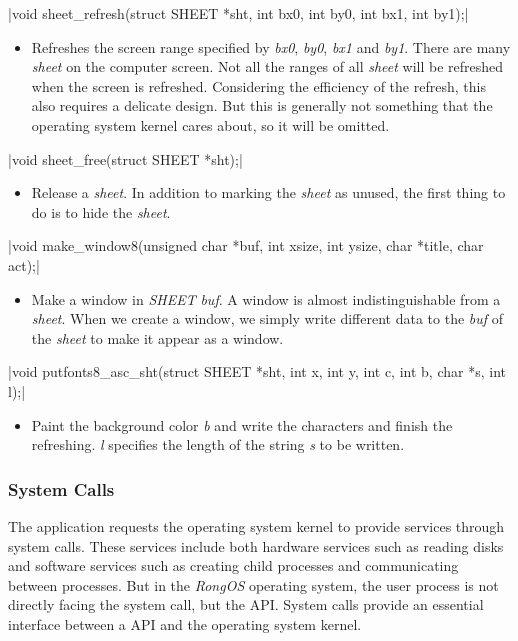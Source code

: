 \documentclass{swfcthesis}
\begin{document}
\csingle|void sheet_refresh(struct SHEET *sht, int bx0, int by0, int bx1, int by1);|
\begin{itemize}
\item Refreshes the screen range specified by \emph{bx0}, \emph{by0}, \emph{bx1} and
  \emph{by1}. There are many \emph{sheet} on the computer screen. Not all the ranges of
  all \emph{sheet} will be refreshed when the screen is refreshed. Considering the
  efficiency of the refresh, this also requires a delicate design. But this is generally
  not something that the operating system kernel cares about, so it will be omitted.
\end{itemize}

\csingle|void sheet_free(struct SHEET *sht);|
\begin{itemize}
\item Release a \emph{sheet}. In addition to marking the \emph{sheet} as unused, the first
  thing to do is to hide the \emph{sheet}. 
\end{itemize}

\csingle|void make_window8(unsigned char *buf, int xsize, int ysize, char *title, char act);|
\begin{itemize}
\item Make a window in \emph{SHEET} \emph{buf}. A window is almost indistinguishable from
  a \emph{sheet}. When we create a window, we simply write different data to the
  \emph{buf} of the \emph{sheet} to make it appear as a window.
  
\end{itemize}

\csingle|void putfonts8_asc_sht(struct SHEET *sht, int x, int y, int c, int b, char *s, int l);|
\begin{itemize}
\item Paint the background color \emph{b} and write the characters and finish the
  refreshing. \emph{l} specifies the length of the string \emph{s} to be written.
    
\end{itemize}

\subsubsection{System Calls}
\label{sec:system-call}

The application requests the operating system kernel to provide services through system
calls. These services include both hardware services such as reading disks and software
services such as creating child processes and communicating between processes. But in the
\emph{RongOS} operating system, the user process is not directly facing the system call,
but the API. System calls provide an essential interface between a API and the operating
system kernel.
\end{document}
